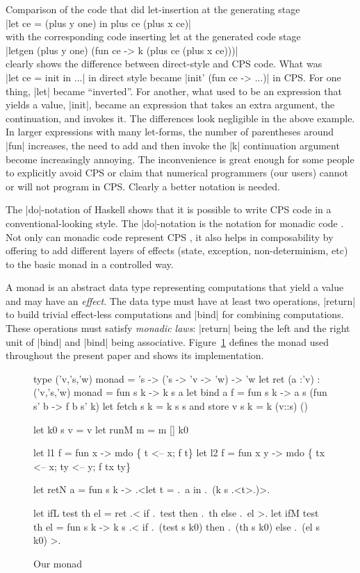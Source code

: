 \documentclass{llncs}
\begin{document}
\noindent Comparison of the code that did let-insertion at the generating stage\\
|let ce = (plus y one) in  plus ce (plus x ce)|\\
with the corresponding code inserting let at the generated code stage\\
|letgen (plus y one) (fun ce -> k (plus ce (plus x ce)))|\\
clearly shows the difference between  direct-style and CPS code.
What was\\ |let ce = init in ...| in direct style became
|init' (fun ce -> ...)| in CPS. For one thing, |let| became
``inverted''. For another, what used to be an expression that yields
a value, |init|, became an expression that takes an extra argument,
the continuation, and invokes it. The differences look negligible in
the above example. In larger expressions with many let-forms, the
number of parentheses around |fun| increases, the need to add and
then invoke the |k| continuation argument become increasingly annoying. The
inconvenience is great enough for some people to explicitly avoid CPS
or claim that numerical programmers (our users) cannot or will not
program in CPS. Clearly a better notation is needed.

The |do|-notation of Haskell \cite{Haskell98Report} shows that it is possible
to write CPS code in a conventional-looking style. The
|do|-notation is the notation for monadic code \cite{moggi-notions}.
Not only can monadic code represent CPS \cite{Filinski:Representing},
it also helps in composability by offering to add different
layers of effects (state, exception, non-determinism, etc) to the
basic monad \cite{liang-interpreter} in a controlled way.

A monad \cite{moggi-notions} is an abstract data type representing
computations that yield a value and may have an \emph{effect}.
The data type must have at least two operations, |return| to build
trivial effect-less computations and |bind| for combining
computations. These operations must satisfy \emph{monadic laws}:
|return| being the left and the right unit of |bind| and |bind| being
associative. Figure~\ref{ourmonad} defines the monad used throughout
the present paper and shows its implementation.

\begin{figure}
\begin{code}
type ('v,'s,'w) monad = 's -> ('s -> 'v -> 'w) -> 'w
let ret (a :'v) : ('v,'s,'w) monad = fun s k -> k s a
let bind a f = fun s k -> a s (fun s' b -> f b s' k)
let fetch s k = k s s  and  store v s k = k (v::s) ()

let k0 s v = v
let runM m = m [] k0

let l1 f = fun x -> mdo \{ t <-- x; f t\}
let l2 f = fun x y -> mdo \{ tx <-- x; ty <-- y; f tx ty\}

let retN a = fun s k -> .<let t = .~a in .~(k s .<t>.)>.

let ifL test th el = ret .< if .~test then .~th else .~el >.
let ifM test th el = fun s k ->
  k s .< if .~(test s k0) then .~(th s k0) else .~(el s k0) >.
\end{code}
\caption{Our monad}\label{ourmonad}
\end{figure}
\end{document}

